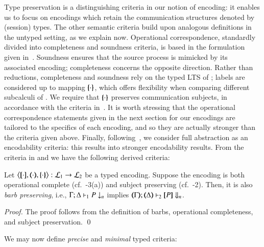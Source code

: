 \noi Type preservation is a distinguishing criteria in our notion of encoding: 
it enables us to focus on encodings which retain the communication structures denoted by (session) types.
The other semantic
criteria build upon analogous definitions in the untyped setting, as we explain now. 
Operational correspondence, standardly divided into completeness and soundness criteria, is based
in the formulation given in~\cite{DBLP:journals/iandc/Gorla10,DBLP:conf/icalp/LanesePSS10}. 
Soundness ensures that the source process is mimicked 
by its associated encoding; completeness concerns the opposite direction.
Rather than reductions, completeness and soundness rely on 
the typed LTS of ; labels are considered up to  mapping
$\{\!\!\{\cdot\}\!\!\}$, which offers flexibility when comparing different subcalculi of \HOp.
We require that $\{\!\!\{\cdot\}\!\!\}$ preserves communication subjects, in accordance with the
criteria in~\cite{DBLP:conf/icalp/LanesePSS10}.
It is worth stressing that 
the operational correspondence statements given in
the next section for our  encodings 
are tailored to the specifics of each encoding, and so they
are actually stronger than the criteria given above.
Finally, following~\cite{SangiorgiD:expmpa,DBLP:conf/lics/PalamidessiSVV06,Yoshida96},
we consider full abstraction as an encodability criteria: this results into 
stronger encodability results. 
From the criteria in  and 
we have the following derived criteria: 

\begin{proposition}\myrm
	\label{p:barbpres}
	Let
	$\enco{\map{\cdot}, \mapt{\cdot}, \mapa{\cdot}}: \tyl{L}_1 \to \tyl{L}_2$
	be a typed encoding.
	Suppose the encoding is both
	operational complete (cf.~-3(a)) 
	and subject preserving (cf.~-2).
	Then, it is also \emph{barb preserving}, i.e., 
	$\Gamma; \Delta \vdash_1 P \downarrow_{n}$
	implies
	$\mapt{\Gamma}; \mapt{\Delta} \proves_2 \map{P} \Barb{n}$.
\end{proposition}

\begin{proof}
	The proof follows from the definition of barbs,
	operational completeness, and subject preservation.
	\qed
\end{proof}

We may now define \emph{precise} and \emph{minimal} typed criteria: 

